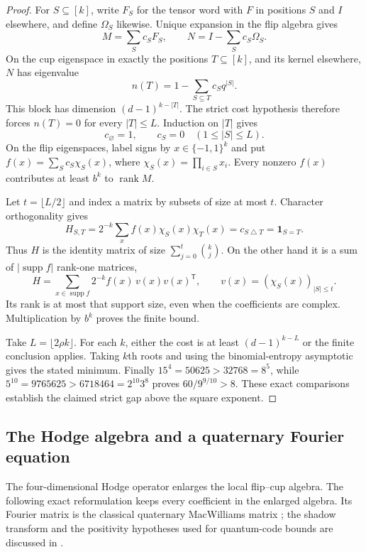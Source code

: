 \begin{proof}
For $S\subseteq[k]$, write $F_S$ for the tensor word with $F$ in
positions $S$ and $I$ elsewhere, and define $\Omega_S$ likewise.
Unique expansion in the flip algebra gives
\[
 M=\sum_S c_SF_S,\qquad N=I-\sum_Sc_S\Omega_S.
\]
On the cup eigenspace in exactly the positions $T\subseteq[k]$,
and its kernel elsewhere, $N$ has eigenvalue
\[
 n(T)=1-\sum_{S\subseteq T}c_Sq^{|S|}.
\]
This block has dimension $(d-1)^{k-|T|}$. The strict cost hypothesis
therefore forces $n(T)=0$ for every $|T|\le L$. Induction on $|T|$
gives
\[
 c_\varnothing=1,\qquad c_S=0\quad(1\le|S|\le L).
\]
On the flip eigenspaces, label signs by $x\in\{-1,1\}^k$ and put
$f(x)=\sum_Sc_S\chi_S(x)$, where
$\chi_S(x)=\prod_{i\in S}x_i$. Every nonzero $f(x)$ contributes
at least $b^k$ to $\operatorname{rank}M$.

Let $t=\lfloor L/2\rfloor$ and index a matrix by subsets of size
at most $t$. Character orthogonality gives
\[
 H_{S,T}=2^{-k}\sum_x f(x)\chi_S(x)\chi_T(x)
        =c_{S\mathbin\triangle T}=\mathbf1_{S=T}.
\]
Thus $H$ is the identity matrix of size
$\sum_{j=0}^{t}\binom{k}{j}$. On the other hand it is a sum of
$|\operatorname{supp}f|$ rank-one matrices,
\[
 H=\sum_{x\in\operatorname{supp}f}
     2^{-k}f(x)\,v(x)v(x)^{\mathsf T},
 \qquad v(x)=(\chi_S(x))_{|S|\le t}.
\]
Its rank is at most that support size, even when the coefficients
are complex. Multiplication by $b^k$ proves the finite bound.

Take $L=\lfloor2\rho k\rfloor$. For each $k$, either the cost
is at least $(d-1)^{k-L}$ or the finite conclusion applies. Taking
$k$th roots and using the binomial-entropy asymptotic gives the
stated minimum. Finally $15^4=50625>32768=8^5$, while
$5^{10}=9765625>6718464=2^{10}3^8$ proves
$60/9^{9/10}>8$. These exact comparisons establish the claimed
strict gap above the square exponent.
\end{proof}

\subsection{The Hodge algebra and a quaternary Fourier equation}

The four-dimensional Hodge operator enlarges the local flip--cup
algebra. The following exact reformulation keeps every coefficient
in the enlarged algebra. Its Fourier matrix is the classical
quaternary MacWilliams matrix
\cite[Theorems~5 and~16]{CRSS1998}; the shadow transform and the
positivity hypotheses used for quantum-code bounds are discussed in
\cite[Theorems~1, 4 and Corollary~7]{Rains1999}.

